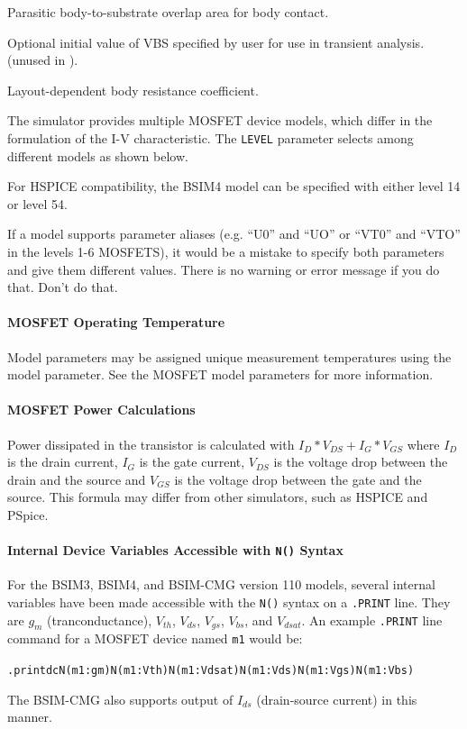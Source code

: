 \begin{Device}
\begin{Parameters}
Parasitic body-to-substrate overlap area for body contact.

Optional initial value of VBS specified by user for use in transient
analysis.  (unused in \Xyce{}).

Layout-dependent body resistance coefficient.

\end{Parameters}

\comments

The simulator provides multiple MOSFET device models, which differ in the
formulation of the I-V characteristic. The \texttt{LEVEL} parameter
selects among different models as shown below.

For HSPICE compatibility, the BSIM4 model can be specified with either
level 14 or level 54.

If a model supports parameter aliases (e.g. ``U0'' and ``UO'' or
``VT0'' and ``VTO'' in the levels 1-6 MOSFETS), it would be a mistake
to specify both parameters and give them different values.  There is
no warning or error message if you do that.  Don't do that.

\end{Device}

\paragraph{MOSFET Operating Temperature}
Model parameters may be assigned unique measurement temperatures using the
 model parameter. See the MOSFET model parameters for more
information.

\paragraph{MOSFET Power Calculations}
Power dissipated in the transistor is calculated with $I_{D}*V_{DS}+I_{G}*V_{GS}$ where
$I_{D}$ is the drain current, $I_{G}$ is the gate current, $V_{DS}$ is the
voltage drop between the drain and the source and $V_{GS}$ is the voltage drop
between the gate and the source. This formula may differ from other simulators,
such as HSPICE and PSpice.

\paragraph{Internal Device Variables Accessible with {\tt N()} Syntax}
For the BSIM3, BSIM4, and BSIM-CMG version 110 models, several
internal variables have been made accessible with the {\tt N()} syntax
on a {\tt .PRINT} line.  They are $g_{m}$ (tranconductance), $V_{th}$,
$V_{ds}$, $V_{gs}$, $V_{bs}$, and $V_{dsat}$.  An example {\tt .PRINT}
line command for a MOSFET device named {\tt m1} would be:
\begin{alltt}
.print dc N(m1:gm) N(m1:Vth) N(m1:Vdsat) N(m1:Vds) N(m1:Vgs) N(m1:Vbs)
\end{alltt}
The BSIM-CMG also supports output of $I_{ds}$ (drain-source current)
in this manner.

